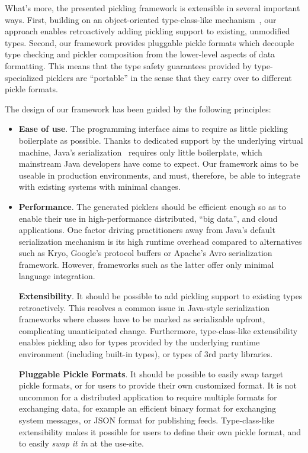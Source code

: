 \documentclass[preprint,10pt]{sigplanconf}
\begin{document}
What's more, the presented pickling framework is extensible in several
important ways. First, building on an object-oriented type-class-like
mechanism~\cite{Oliveira2010}, our approach enables retroactively adding
pickling support to existing, unmodified types. Second, our framework provides
pluggable pickle formats which decouple type checking and pickler composition
from the lower-level aspects of data formatting. This means that the type
safety guarantees provided by type-specialized picklers are ``portable'' in
the sense that they carry over to different pickle formats.

The design of our framework has been guided by the following principles:

\begin{itemize}
\item {\bf Ease of use}. The programming interface aims to require as little
pickling boilerplate as possible. Thanks to dedicated support by the
underlying virtual machine, Java's serialization~\cite{JavaSerialization}
requires only little boilerplate, which mainstream Java developers have come
to expect. Our framework aims to be useable in production environments, and
must, therefore, be able to integrate with existing systems with minimal
changes.

\item {\bf Performance}. The generated picklers should be efficient enough  so
as to enable their use in high-performance distributed, ``big data'', and
cloud applications. One factor driving practitioners away from Java's default
serialization mechanism is its high runtime overhead compared to alternatives
such as Kryo, Google's protocol buffers or Apache's Avro serialization
framework. However, frameworks such as the latter offer only minimal language
integration.

{\bf Extensibility}. It should be possible to add pickling support to existing
types retroactively. This resolves a common issue in Java-style serialization
frameworks where classes have to be marked as serializable upfront,
complicating unanticipated change. Furthermore, type-class-like extensibility
enables pickling also for types provided by the underlying runtime environment
(including built-in types), or types of 3rd party libraries.

{\bf Pluggable Pickle Formats}. It should be possible to easily swap target
pickle formats, or for users to provide their own customized format. It is not
uncommon for a distributed application to require multiple formats for
exchanging data, for example an efficient binary format for exchanging system
messages, or JSON format for publishing feeds. Type-class-like extensibility
makes it possible for users to define their own pickle format, and to easily
{\em swap it in} at the use-site.


\end{itemize}
\end{document}
